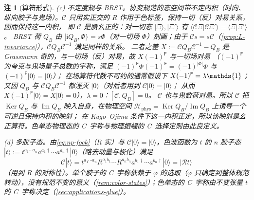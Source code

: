 \documentclass[UTF8,a4paper,11pt,fontset=fandol]{ctexart}
\let\amsmathbb\mathbb
\renewcommand{\mathbb}[1]{\ifx1#1\mathds{1}\else\amsmathbb{#1}\fi}
\theoremstyle{cplain}
\theoremstyle{cdefinition}
\theoremstyle{cremark}
\newtheorem{remark}[theorem]{注}
\numberwithin{equation}{section}
\newcommand{\Cop}{\mathcal{C}}                       %
\newcommand{\Rop}{\mathcal{R}}                       %
\newcommand{\ii}{\mathrm{i}}                        %
\begin{document}
\begin{remark}[算符形式]
(c) \emph{不定度规与 BRST。}协变规范的态空间带不定内积（时向、纵向胶子与鬼场）。$\Cop$ 只用实正交的 $R$ 作用于色标签，保持一切（反）对易关系，因而保持这一内积，
即 $\Cop$ 是赝幺正的：对一切态 $|\Xi\rangle,|\Xi'\rangle$ 有 $\langle\Cop\Xi|\Cop\Xi'\rangle=\langle\Xi|\Xi'\rangle$。
BRST 荷 $Q_B$ 由 $[\ii Q_B,\Phi\}=s\Phi$（对一切场 $\Phi$）刻画；由于 $\Cop s=s\Cop$（\cref{prop:L-invariance}），$\Cop Q_B\Cop^{-1}$ 满足同样的关系。
二者之差 $X:=\Cop Q_B\Cop^{-1}-Q_B$ 是 Grassmann 奇的，与一切场（反）对易，故 $X(-1)^{\mathsf F}$ 与一切场对易
（$(-1)^{\mathsf F}$ 为夸克与鬼场量子总数的宇称，满足 $(-1)^{\mathsf F}\Phi(-1)^{\mathsf F}=(-1)^{|\Phi|}\Phi$ 与 $(-1)^{\mathsf F}|0\rangle=|0\rangle$）；
在场算符代数不可约的通常假设下 $X(-1)^{\mathsf F}=\lambda\mathbb 1$；又因 $Q_B$ 与 $\Cop Q_B\Cop^{-1}$ 都湮灭 $|0\rangle$（对后者用到 $\Cop|0\rangle=|0\rangle$；
从而 $X(-1)^{\mathsf F}|0\rangle=X|0\rangle=0$），$\lambda=0$：$[\Cop,Q_B]=0$。
$\Cop$ 也与鬼数荷对易。所以 $\Cop$ 把 $\operatorname{Ker}Q_B$ 与 $\operatorname{Im}Q_B$ 映入自身，在物理空间 $\mathcal H_{\mathrm{phys}}=\operatorname{Ker}Q_B/\operatorname{Im}Q_B$ 上诱导一个可逆且保持内积的映射；
在 Kugo--Ojima 条件下这一内积正定\cite{KugoOjima1979}，所以该映射是幺正算符。色单态物理态的 C~宇称与物理振幅的 C~选择定则由此良定义。

(d) \emph{多胶子态。}由\cref{eq:np-fock}（$R$ 实）与 $\Cop|0\rangle=|0\rangle$，色波函数为 $t$ 的 $n$ 胶子态 $|t\rangle:=t^{a_1\cdots a_n}a^{a_1\dagger}\cdots a^{a_n\dagger}|0\rangle$（略去动量与极化）满足
\begin{equation}\label{eq:np-gluon-states}
\Cop|t\rangle=t^{a_1\cdots a_n}R^{a_1b_1}\cdots R^{a_nb_n}a^{b_1\dagger}\cdots a^{b_n\dagger}|0\rangle=|\Rop t\rangle
\end{equation}
（用到 $R$ 的对称性）。单个胶子的 C~宇称依赖于 $\varphi$ 的选取（$\varphi$ 只确定到整体规范转动），没有规范不变的意义（\cref{rem:color-states}）；色单态的 C~宇称由不变张量 $t$ 的 C~宇称决定（\cref{sec:applications-glue}）。
\end{remark}
\end{document}
